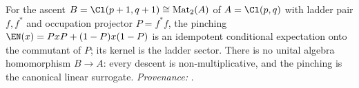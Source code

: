 For the ascent $B = \Cl(p+1, q+1) \cong \mathrm{Mat}_{2}(A)$ of $A = \Cl(p,q)$ with ladder pair $f, f^{*}$ and occupation projector $P = f^{*}f$, the pinching $\EN(x) = PxP + (1-P)x(1-P)$ is an idempotent conditional expectation onto the commutant of $P$; its kernel is the ladder sector. There is no unital algebra homomorphism $B \to A$: every descent is non-multiplicative, and the pinching is the canonical linear surrogate. \emph{Provenance:} \cite[Prop.~7.5, Thm.~7.6]{ButlerT1}.
